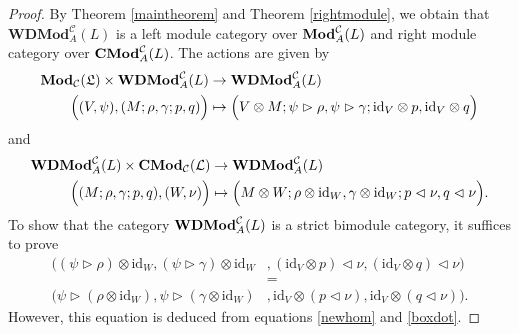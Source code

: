 \documentclass[11pt]{amsart}
\newcommand{\calC}{\mathcal{C}}
\newcommand{\id}{\mathrm{id}}
\theoremstyle{definition}
\numberwithin{equation}{section}
\begin{document}
\begin{proof}
By Theorem \ref{maintheorem} and Theorem \ref{rightmodule}, we obtain that $\textbf{WDMod}^{\calC}_A(L)$ is a left module category over $\mathrm{\bf Mod}^{\calC}_A(L)$ and right module category over $\mathrm{\bf CMod}^{\calC}_A(L)$. The actions are given by 
\begin{align*}
				\mathrm{\bf Mod}_{\calC}( \mathfrak{L}) \times \mathrm{\bf WDMod}^{\calC}_A(L)& \to \mathrm{\bf WDMod}^{\calC}_A(L)\\
				\Big((V,\psi), (M;\rho,\gamma;p,q)      \Big)& \mapsto \Big(V\otimes M; \psi \vartriangleright \rho, \psi \vartriangleright \gamma; \id_V\otimes p, \id_V \otimes q\Big)
\end{align*}
and
\begin{align*}
				\mathrm{\bf WDMod}^{\calC}_A(L) \times \mathrm{\bf CMod}_{\calC}(\mathcal{L}) &\to \mathrm{\bf WDMod}^{\calC}_A(L)\\
				\Big((M;\rho,\gamma;p,q), (W,\nu)   \Big) & \mapsto \Big(M\otimes W; \rho \otimes \id_W, \gamma\otimes \id_W;p\vartriangleleft \nu, q \vartriangleleft \nu \Big).
\end{align*}
To show that the category $\mathrm{\bf WDMod}^{\calC}_A(L)$ is a strict bimodule category, it suffices to prove 
\begin{align*}
				\Big( (\psi\vartriangleright \rho) \otimes \id_W, (\psi \vartriangleright \gamma)\otimes \id_W&, (\id_V\otimes p ) \vartriangleleft \nu, (\id_V \otimes q) \vartriangleleft \nu    \Big) \\
				&=\\
				\Big( \psi \vartriangleright (\rho \otimes \id_W), \psi \vartriangleright (\gamma \otimes \id_W)&,  \id_V\otimes(p \vartriangleleft \nu), \id_V\otimes (q\vartriangleleft \nu)    \Big).
\end{align*} 
However, this equation is deduced from equations \eqref{newhom} and \eqref{boxdot}. 
\end{proof}
		
		
\end{document}
